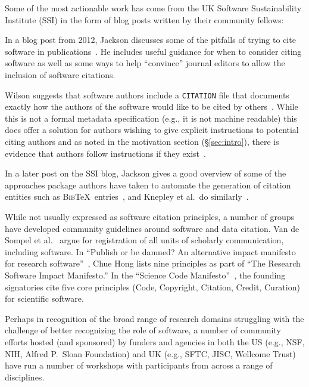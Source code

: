 \documentclass[11pt, oneside]{amsart}
\begin{document}
Some of the most actionable work has come from the UK Software Sustainability
Institute (SSI) in the form of blog posts written by their community fellows:

In a blog post from 2012, Jackson discusses some of the pitfalls of trying to
cite software in publications~\cite{ssi-how-to-cite}. He includes useful
guidance for when to consider citing software as well as some ways to help
``convince'' journal editors to allow the inclusion of software citations.

Wilson suggests that software authors include a \texttt{CITATION} file that
documents exactly how the authors of the software would like to be cited by
others~\cite{ssi-citation-files}. While this is not a formal metadata
specification (e.g., it is not machine readable) this does offer a solution for
authors wishing to give explicit instructions to potential citing authors and as
noted in the motivation section (\S\ref{sec:intro}), there is evidence that
authors follow instructions if they exist~\cite{10.1371/journal.pone.0136631}.

In a later post on the SSI blog, Jackson gives a good overview of some of the
approaches package authors have taken to automate the generation of citation
entities such as \textsc{Bib}\TeX\ entries~\cite{ssi-how-shalt-i-cite-thee}, and
Knepley et al.\ do similarly~\cite{knepley2013accurately}.

While not usually expressed as software citation principles, a number of groups
have developed community guidelines around software and data citation. Van de
Sompel et al.~\cite{VandeSompel2004} argue for registration of all units of
scholarly communication, including software. In ``Publish or be damned? An
alternative impact manifesto for research
software''~\cite{ssi-publish-or-be-damned}, Chue Hong lists nine principles as
part of ``The Research Software Impact Manifesto.'' In the
``Science Code Manifesto''~\cite{sciencecodemanifesto}, the founding signatories
cite five core principles (Code, Copyright, Citation, Credit, Curation) for
scientific software.

Perhaps in recognition of the broad range of research domains struggling with
the challenge of better recognizing the role of software, a number of community
efforts hosted (and sponsored) by funders and agencies in both the US (e.g.,
NSF, NIH, Alfred P.\ Sloan Foundation) and UK (e.g., SFTC, JISC, Wellcome Trust)
have run a number of workshops with participants from across a range of
disciplines.
\end{document}
